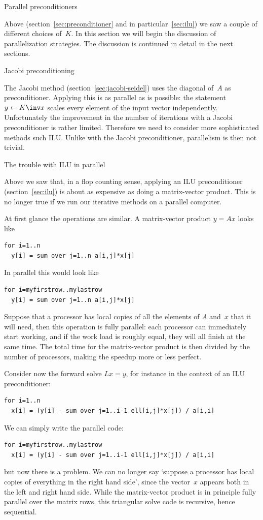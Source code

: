  {Parallel preconditioners}
\label{sec:parallel-prec}

Above (section~\ref{sec:preconditioner} and in particular~\ref{sec:ilu}) we saw a
couple of different choices of~$K$. In this section we will begin the
discussion of parallelization strategies. The discussion is continued
in detail in the next sections.

 {Jacobi preconditioning}

The Jacobi method (section~\ref{sec:jacobi-seidel}) uses the diagonal
of~$A$ as preconditioner. Applying this is as parallel as is
possible: the statement $y\leftarrow K\inv x$ scales every element of
the input vector independently. Unfortunately the improvement in the
number of iterations with a Jacobi preconditioner is rather
limited. Therefore we need to consider more sophisticated methods such
\ac{ILU}. Unlike with the Jacobi preconditioner, parallelism is then
not trivial.

 {The trouble with ILU in parallel}

Above we saw that, in a flop counting sense, applying an ILU
preconditioner (section~\ref{sec:ilu}) is about as expensive as doing
a matrix-vector product. This is no longer true if we run our
iterative methods on a parallel computer.

At first glance the operations are similar. A matrix-vector product
$y=Ax$ looks like
\begin{verbatim}
for i=1..n
  y[i] = sum over j=1..n a[i,j]*x[j]
\end{verbatim}
In parallel this would look like
\begin{verbatim}
for i=myfirstrow..mylastrow
  y[i] = sum over j=1..n a[i,j]*x[j]
\end{verbatim}
Suppose that a processor has local copies of all the elements of $A$
and~$x$ that it will need, then this operation is fully parallel: each
processor can immediately start working, and if the work load is
roughly equal, they will all finish at the same time. The total time
for the matrix-vector product is then divided by the number of
processors, making the speedup more or less perfect.

Consider now the forward solve $Lx=y$, for instance in the context of
an \ac{ILU} preconditioner:
\begin{verbatim}
for i=1..n
  x[i] = (y[i] - sum over j=1..i-1 ell[i,j]*x[j]) / a[i,i]
\end{verbatim}
We can simply write the parallel code:
\begin{verbatim}
for i=myfirstrow..mylastrow
  x[i] = (y[i] - sum over j=1..i-1 ell[i,j]*x[j]) / a[i,i]
\end{verbatim}
but now there is a problem. We can no longer say `suppose a processor
has local copies of everything in the right hand side', since the
vector~$x$ appears both in the left and right hand side. While the
matrix-vector product is in principle fully parallel over the matrix
rows, this triangular solve code is recursive, hence sequential.

